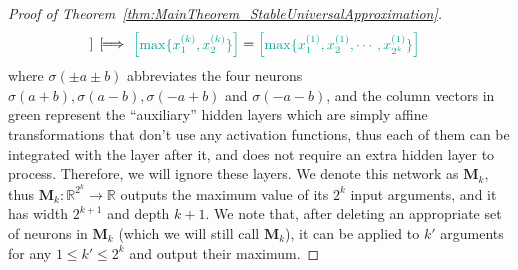\documentclass{article}
\numberwithin{equation}{section}
\theoremstyle{definition}
\begin{document}
\begin{proof}[{Proof of Theorem~\ref{thm:MainTheorem_StableUniversalApproximation}}]
\begin{align}
\begin{bmatrix}
    \end{bmatrix}
    \ \Longrightarrow \
    {\color{persiangreen}
    \begin{bmatrix} \max\{x_1^{(k)},x_2^{(k)}\} \end{bmatrix}
    }
    = 
    {\color{persiangreen}
    \begin{bmatrix} 
        \max\{x_1^{(1)},x_2^{(1)},\cdots,x_{2^k}^{(1)}\} 
    \end{bmatrix}
    }
\end{align}
where $\sigma(\pm a\pm b)$ abbreviates the four neurons $\sigma(a+b),\sigma(a-b),\sigma(-a+b)$ and $\sigma(-a-b)$, and the column vectors in green represent the ``auxiliary'' hidden layers which are simply affine transformations that don't use any activation functions, thus each of them can be integrated with the layer after it, and does not require an extra hidden layer to process. Therefore, we will ignore these layers. We denote this network as $\mathbf{M}_k$, thus $\mathbf{M}_k: \mathbb{R}^{2^k} \rightarrow \mathbb{R}$ outputs the maximum value of its $2^k$ input arguments, and it has width $2^{k+1}$ and depth $k+1$. We note that, after deleting an appropriate set of neurons in $\mathbf{M}_k$ (which we will still call $\mathbf{M}_k$), it can be applied to $k'$ arguments for any $1\le k'\le 2^k$ and output their maximum. 


\end{proof}
\end{document}
